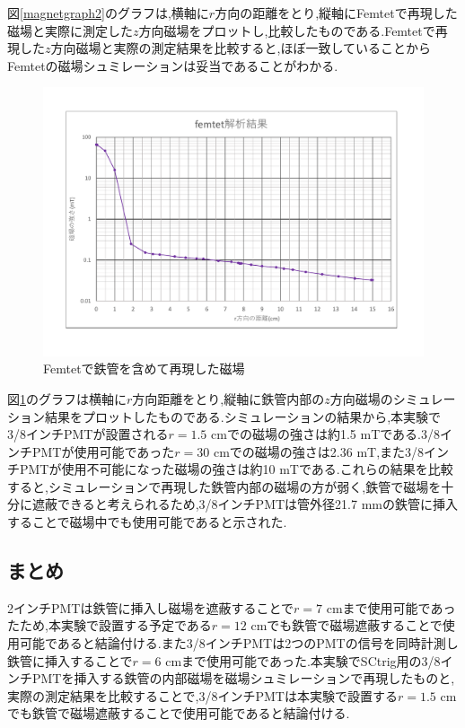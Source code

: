 図\ref{magnetgraph2}のグラフは,横軸に$r$方向の距離をとり,縦軸にFemtetで再現した磁場と実際に測定した$z$方向磁場をプロットし,比較したものである.Femtetで再現した$z$方向磁場と実際の測定結果を比較すると,ほぼ一致していることからFemtetの磁場シュミレーションは妥当であることがわかる.

\begin{figure}[tbp]
	\centering
		\includegraphics[width=15cm]{fig/iguchi/Femtetsaigengraph.pdf}
	\caption{Femtetで鉄管を含めて再現した磁場\newline}
	\label{Femtetsaigengraph}
\end{figure}

図\ref{Femtetsaigengraph}のグラフは横軸に$r$方向距離をとり,縦軸に鉄管内部の$z$方向磁場のシミュレーション結果をプロットしたものである.シミュレーションの結果から,本実験で3/8インチPMTが設置される$r=1.5$ cmでの磁場の強さは約1.5 mTである.3/8インチPMTが使用可能であった$r=30$ cmでの磁場の強さは2.36 mT,また3/8インチPMTが使用不可能になった磁場の強さは約10 mTである.これらの結果を比較すると,シミュレーションで再現した鉄管内部の磁場の方が弱く,鉄管で磁場を十分に遮蔽できると考えられるため,3/8インチPMTは管外径21.7 mmの鉄管に挿入することで磁場中でも使用可能であると示された.

\subsection{まとめ}
2インチPMTは鉄管に挿入し磁場を遮蔽することで$r=7$ cmまで使用可能であったため,本実験で設置する予定である$r=12$ cmでも鉄管で磁場遮蔽することで使用可能であると結論付ける.また3/8インチPMTは2つのPMTの信号を同時計測し鉄管に挿入することで$r=6$ cmまで使用可能であった.本実験でSCtrig用の3/8インチPMTを挿入する鉄管の内部磁場を磁場シュミレーションで再現したものと,実際の測定結果を比較することで,3/8インチPMTは本実験で設置する$r=1.5$ cmでも鉄管で磁場遮蔽することで使用可能であると結論付ける.


